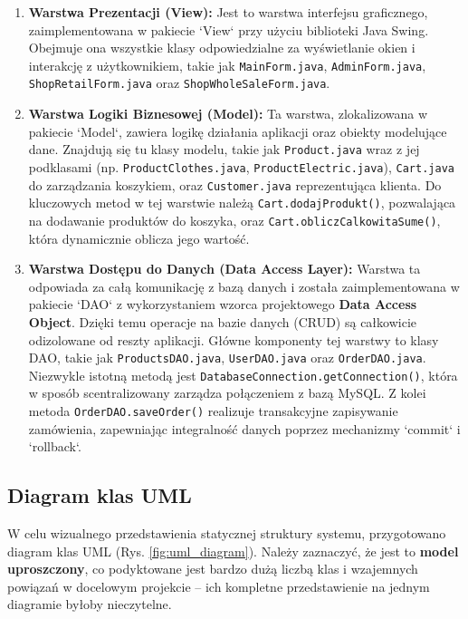\begin{enumerate}
    \item \textbf{Warstwa Prezentacji (View):} Jest to warstwa interfejsu graficznego, zaimplementowana w pakiecie `View` przy użyciu biblioteki Java Swing. Obejmuje ona wszystkie klasy odpowiedzialne za wyświetlanie okien i interakcję z użytkownikiem, takie jak \texttt{MainForm.java}, \texttt{AdminForm.java}, \texttt{ShopRetailForm.java} oraz \texttt{ShopWholeSaleForm.java}.
    
    \item \textbf{Warstwa Logiki Biznesowej (Model):} Ta warstwa, zlokalizowana w pakiecie `Model`, zawiera logikę działania aplikacji oraz obiekty modelujące dane. Znajdują się tu klasy modelu, takie jak \texttt{Product.java} wraz z jej podklasami (np. \texttt{ProductClothes.java}, \texttt{ProductElectric.java}), \texttt{Cart.java} do zarządzania koszykiem, oraz \texttt{Customer.java} reprezentująca klienta. Do kluczowych metod w tej warstwie należą \texttt{Cart.dodajProdukt()}, pozwalająca na dodawanie produktów do koszyka, oraz \texttt{Cart.obliczCalkowitaSume()}, która dynamicznie oblicza jego wartość.
    
    \item \textbf{Warstwa Dostępu do Danych (Data Access Layer):} Warstwa ta odpowiada za całą komunikację z bazą danych i została zaimplementowana w pakiecie `DAO` z wykorzystaniem wzorca projektowego \textbf{Data Access Object}. Dzięki temu operacje na bazie danych (CRUD) są całkowicie odizolowane od reszty aplikacji. Główne komponenty tej warstwy to klasy DAO, takie jak \texttt{ProductsDAO.java}, \texttt{UserDAO.java} oraz \texttt{OrderDAO.java}. Niezwykle istotną metodą jest \texttt{DatabaseConnection.getConnection()}, która w sposób scentralizowany zarządza połączeniem z bazą MySQL. Z kolei metoda \texttt{OrderDAO.saveOrder()} realizuje transakcyjne zapisywanie zamówienia, zapewniając integralność danych poprzez mechanizmy `commit` i `rollback`.
\end{enumerate}


\subsection{Diagram klas UML}
W celu wizualnego przedstawienia statycznej struktury systemu, przygotowano diagram klas UML (Rys. \ref{fig:uml_diagram}). Należy zaznaczyć, że jest to \textbf{model uproszczony}, co podyktowane jest bardzo dużą liczbą klas i wzajemnych powiązań w docelowym projekcie – ich kompletne przedstawienie na jednym diagramie byłoby nieczytelne.

